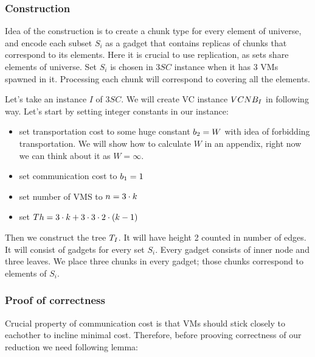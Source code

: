 \subsubsection{Construction}

Idea of the construction is to create a chunk type for every element
of universe, and encode each subset $S_i$ as a gadget that contains
replicas of chunks that correspond to its elements. Here it is crucial
to use replication, as sets share elements of universe. Set $S_i$ is
chosen in $3SC$ instance when it has $3$ VMs spawned in it. Processing
each chunk will correspond to covering all the elements.


Let's take an instance $I$ of $3SC$. We will create VC instance $VCNB_I$ in following
way. Let's start by setting integer constants in our instance:
\begin{itemize}
\item set transportation cost to some huge constant $b_2 = W$
  with idea of forbidding transportation. We will show how to
  calculate $W$ in an appendix, right now we can think about it as $W
  = \infty$.
\item set communication cost to $b_1 = 1$
\item set number of VMS to $n = 3 \cdot k$
\item set $Th =  3 \cdot k + 3 \cdot 3 \cdot 2 \cdot (k - 1)$
\end{itemize}


Then we construct the tree $T_I$. It will have height 2 counted in number of
edges. It will consist of gadgets for every set $S_i$. Every gadget
consists of inner node and three leaves. We place three chunks in
every gadget; those chunks correspond to elements of $S_i$. 

\subsubsection{Proof of correctness}

Crucial property of communication cost is that VMs should stick
closely to eachother to incline minimal cost. Therefore, before
prooving correctness of our reduction we need following lemma:

